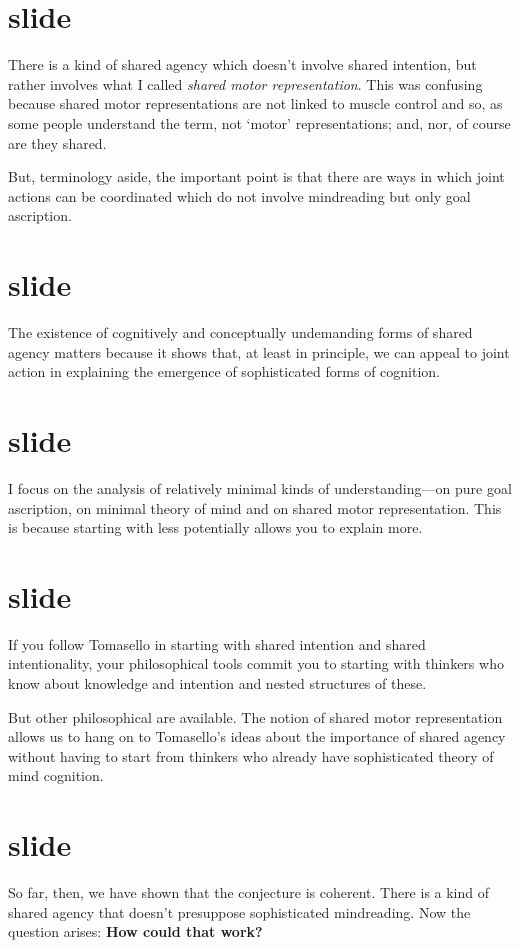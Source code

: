 \documentclass[12pt,\papersize]{extarticle}
\begin{document}
\section{slide}
There is a kind of shared agency which doesn't involve shared intention,
but rather involves what I called \emph{shared motor representation}.
This was confusing because shared motor representations are not linked to muscle control and so, as some people understand the term, not `motor' representations; and, nor, of course are they shared.

But, terminology aside, the important point is that there are ways in which joint actions can be coordinated which do not involve mindreading but only goal ascription.


\section{slide}
The existence of cognitively and conceptually undemanding forms of shared agency 
 matters 
 because it shows that, at least in principle, we can appeal to joint action in explaining the emergence of sophisticated forms of cognition.


\section{slide}
I focus  on the analysis of relatively minimal kinds of understanding---on pure goal ascription, on minimal theory of mind and  on shared motor representation.
This is because starting with less potentially allows you to explain more.


\section{slide}
If you follow Tomasello in starting with shared intention and shared intentionality, 
your philosophical tools commit you to starting with thinkers who know about knowledge and intention and nested structures of these.

But other philosophical are available.
The notion of shared motor representation allows us to 
	hang on to Tomasello's ideas about the importance of shared agency
	without having to start from thinkers who already have sophisticated theory of mind cognition.



\section{slide}
So far, then, we have shown that the conjecture is coherent.
There is a kind of shared agency that doesn't presuppose sophisticated mindreading.
Now the question arises:
\textbf{How could that work?}
\end{document}
